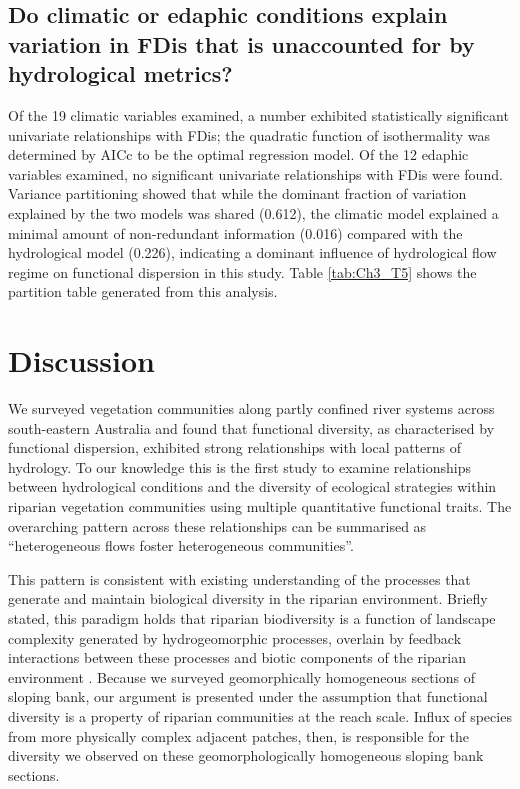 \subsection{Do climatic or edaphic conditions explain variation in FDis that is unaccounted for by hydrological metrics?}
Of the 19 climatic variables examined, a number exhibited statistically significant univariate relationships with FDis; the quadratic function of isothermality was determined by AICc to be the optimal regression model. Of the 12 edaphic variables examined, no significant univariate relationships with FDis were found.  Variance partitioning showed that while the dominant fraction of variation explained by the two models was shared (0.612), the climatic model explained a minimal amount of non-redundant information (0.016) compared with the hydrological model (0.226), indicating a dominant influence of hydrological flow regime on functional dispersion in this study. Table \ref{tab:Ch3_T5} shows the partition table generated from this analysis.



\section{Discussion}
We surveyed vegetation communities along partly confined river systems across south-eastern Australia and found that functional diversity, as characterised by functional dispersion, exhibited strong relationships with local patterns of hydrology. To our knowledge this is the first study to examine relationships between hydrological conditions and the diversity of ecological strategies within riparian vegetation communities using multiple quantitative functional traits. The overarching pattern across these relationships can be summarised as “heterogeneous flows foster heterogeneous communities”.

This pattern is consistent with existing understanding of the processes that generate and maintain biological diversity in the riparian environment. Briefly stated, this paradigm holds that riparian biodiversity is a function of landscape complexity generated by hydrogeomorphic processes, overlain by feedback interactions between these processes and biotic components of the riparian environment \citep{Tabacchi1998, Palmer1997, Corenblit2007, Bornette2008}. Because we surveyed geomorphically homogeneous sections of sloping bank, our argument is presented under the assumption that functional diversity is a property of riparian communities at the reach scale. Influx of species from more physically complex adjacent patches, then, is responsible for the diversity we observed on these geomorphologically homogeneous sloping bank sections.

